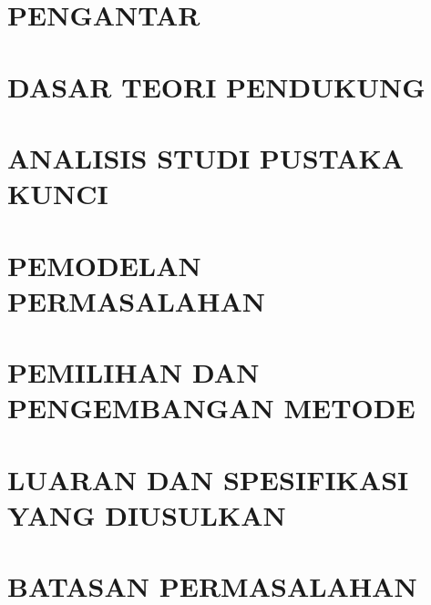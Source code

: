 \documentclass{data/DTETI_Capstone_C251}
\begin{document}


\maketitle

\chapter{\uppercase{Pengantar}}
\label{chap:Pengantar}


\chapter{\uppercase{Dasar Teori Pendukung}}
\label{chap:Dasar_Teori_Pendukung}


\chapter{\uppercase{Analisis Studi Pustaka Kunci}}
\label{chap:Analisis_Studi_Pustaka_Kunci}


\chapter{\uppercase{Pemodelan Permasalahan}}
\label{chap:Pemodelan_Permasalahan}


\chapter{\uppercase{Pemilihan dan Pengembangan Metode}}
\label{chap:Pemilihan_dan_Pengembangan_Metode}


\chapter{\uppercase{Luaran dan Spesifikasi yang Diusulkan}}
\label{chap:Luaran_dan_Spesifikasi_yang_Diusulkan}


\chapter{\uppercase{Batasan Permasalahan}}
\label{chap:Batasan_Permasalahan}

\end{document}
